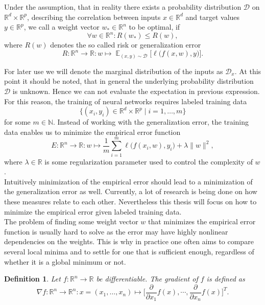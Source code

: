 \documentclass[11pt, a4paper]{article}
\newtheorem{definition}[theorem]{Definition}
\newcommand{\N}{\mathds{N}}
\newcommand{\R}{\mathds{R}}
\newcommand{\D}{\mathcal{D}}
\DeclareMathOperator*{\E}{\mathds{E}}
\begin{document}
Under the assumption, that in reality there exists a probability distribution $\D$ on $\R^d \times \R^p$, describing the correlation between inputs $x \in \R^d$ and target values $y \in \R^p$, we call a weight vector $w_* \in \R^n$ to be optimal, if
\[ \forall w \in \R^n : R(w_*) \leq R(w), \]
where $R(w)$ denotes the so called risk or generalization error 
\[ R : \R^n \to \R : w \mapsto \E_{(x,y) \sim \D } \Big [ \ell \big (f(x,w),y \big ) \Big ]. \]

For later use we will denote the marginal distribution of the inputs as $\D_x$. At this point it should be noted, that in general the underlying probability distribution $\D$ is unknown. Hence we can not evaluate the expectation in previous expression. \\

For this reason, the training of neural networks requires labeled training data
\[ \Big \{ (x_i,y_i) \in \R^d \times \R^p \mid i=1, \dots, m \Big \} \]
for some $m \in \N$. Instead of working with the generalization error, the training data enables us to minimize the empirical error function
 \[ E : \R^n \to \R : w \mapsto \frac{1}{m} \sum_{i=1}^{m} \ell \big ( f(x_i,w),y_i \big) + \lambda \| w \|^2, \]
where $\lambda \in \R$ is some regularization parameter used to control the complexity of $w$. \\
 
Intuitively minimization of the empirical error should lead to a minimization of the generalization error as well. Currently, a lot of research is being done on how these measures relate to each other. Nevertheless this thesis will focus on how to minimize the empirical error given labeled training data. \\

The problem of finding some weight vector $w$ that minimizes the empirical error function is usually hard to solve as the error may have highly nonlinear dependencies on the weights. This is why in practice one often aims to compare several local minima and to settle for one that is sufficient enough, regardless of whether it is a global minimum or not.

\begin{definition}
Let $f: \R^n \to \R$ be differentiable. The gradient of $f$ is defined as
\[ \nabla f : \R^n \to \R^n : x = (x_1, \dots, x_n) \mapsto \bigg [ \frac{\partial}{\partial x_1} f(x), \cdots, \frac{\partial}{\partial x_n} f(x) \bigg ]^T. \]
\end{definition}
\end{document}
